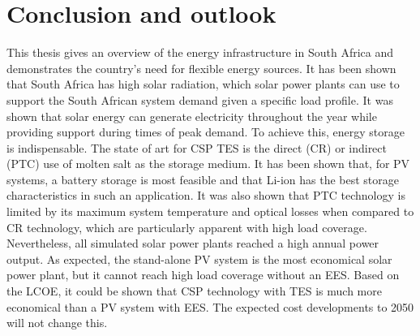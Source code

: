\chapter{Conclusion and outlook}

This thesis gives an overview of the energy infrastructure in South Africa and demonstrates the country's need for flexible energy sources. It has been shown that South Africa has high solar radiation, which solar power plants can use to support the South African system demand given a specific load profile. It was shown that solar energy can generate electricity throughout the year while providing support during times of peak demand. To achieve this, energy storage is indispensable. The state of art for CSP TES is the direct (CR) or indirect (PTC) use of molten salt as the storage medium. It has been shown that, for PV systems, a battery storage is most feasible and that Li-ion has the best storage characteristics in such an application. It was also shown that PTC technology is limited by its maximum system temperature and optical losses when compared to CR technology, which are particularly apparent with high load coverage. Nevertheless, all simulated solar power plants reached a high annual power output. As expected, the stand-alone PV system is the most economical solar power plant, but it cannot reach high load coverage without an EES. Based on the LCOE, it could be shown that CSP technology with TES is much more economical than a PV system with EES. The expected cost developments to 2050 will not change this.


